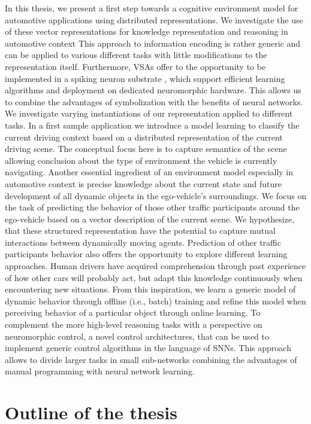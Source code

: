In this thesis, we present a first step towards a cognitive environment model for automotive applications using distributed representations.
We investigate the use of these vector representations for knowledge representation and reasoning in automotive context 
This approach to information encoding is rather generic and can be applied to various different tasks with little modifications to the representation itself.
Furthermore, \acp{VSA} offer to the opportunity to be implemented in a spiking neuron substrate \citep{Eliasmith2013}, which support efficient learning algorithms and deployment on dedicated neuromorphic hardware.
This allows us to combine the advantages of symbolization with the benefits of neural networks.
We investigate varying instantiations of our representation applied to different tasks.
In a first sample application we introduce a model learning to classify the current driving context based on a distributed representation of the current driving scene. 
The conceptual focus here is to capture semantics of the scene allowing conclusion about the type of environment the vehicle is currently navigating.
Another essential ingredient of an environment model especially in automotive context is precise knowledge about the current state and future development of all dynamic objects in the ego-vehicle's surroundings.
We focus on the task of predicting the behavior of those other traffic participants around the ego-vehicle based on a vector description of the current scene.
We hypothesize, that these structured representation have the potential to capture mutual interactions between dynamically moving agents.
Prediction of other traffic participants behavior also offers the opportunity to explore different learning approaches.
Human drivers have acquired comprehension through past experience of how other cars will probably act, but adapt this knowledge continuously when encountering new situations.
From this inspiration, we learn a generic model of dynamic behavior through offline (i.e., batch) training and refine this model when perceiving behavior of a particular object through online learning.
To complement the more high-level reasoning tasks with a perspective on neuromorphic control, a novel control architectures, that can be used to implement generic control algorithms in the language of \acp{SNN}.
This approach allows to divide larger tasks in small sub-networks combining the advantages of manual programming with neural network learning.

\section{Outline of the thesis}%
\label{sec:outline_of_the_thesis}

